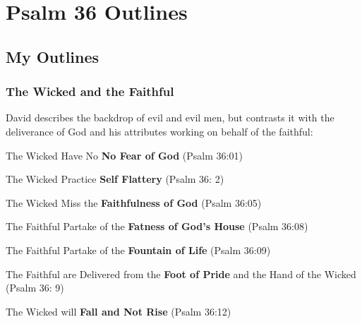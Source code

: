 \section{Psalm 36 Outlines}

\subsection{My Outlines}

\subsubsection{The Wicked and the Faithful}
David describes the backdrop of evil and evil men, but contrasts it with the deliverance of God and his attributes working on behalf of the faithful:
\begin{compactenum}[I.]
    \item The Wicked Have No \textbf{No Fear of God} (Psalm 36:01)
    \item The Wicked Practice \textbf{Self Flattery} (Psalm 36: 2)
    \item The Wicked Miss the \textbf{Faithfulness of God}  (Psalm 36:05)
    \item The Faithful Partake of the \textbf{Fatness of God's House}  (Psalm 36:08)
    \item The Faithful Partake of the \textbf{Fountain of Life}  (Psalm 36:09)
    \item The Faithful are Delivered from the \textbf{Foot of Pride} and the Hand of the Wicked  (Psalm 36: 9)
    \item The Wicked will \textbf{Fall and Not Rise}  (Psalm 36:12)
\end{compactenum}


